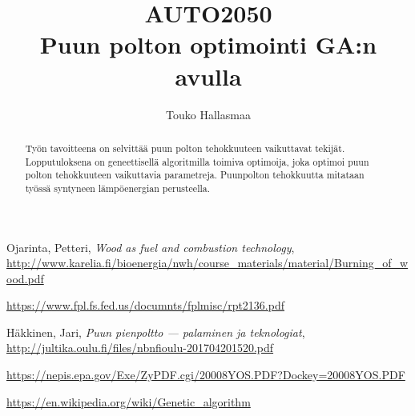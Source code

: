 \documentclass[12pt]{article}
\title{\normalsize\uppercase{auto2050}\\\Huge Puun polton optimointi GA:n avulla}
\author{Touko Hallasmaa}
\date{}
\begin{document}
\maketitle
\tableofcontents

\begin{abstract}
Työn tavoitteena on selvittää puun polton tehokkuuteen vaikuttavat tekijät.
Lopputuloksena on geneettisellä algoritmilla toimiva optimoija, joka optimoi
puun polton tehokkuuteen vaikuttavia parametreja. Puunpolton tehokkuutta
mitataan työssä syntyneen lämpöenergian perusteella.
\end{abstract}







\begin{thebibliography}{9}
	Ojarinta, Petteri,
	\textit{Wood as fuel and combustion technology},
	\url{http://www.karelia.fi/bioenergia/nwh/course_materials/material/Burning_of_wood.pdf}

	\url{https://www.fpl.fs.fed.us/documnts/fplmisc/rpt2136.pdf}

	Häkkinen, Jari,
	\textit{Puun pienpoltto --- palaminen ja teknologiat},
	\url{http://jultika.oulu.fi/files/nbnfioulu-201704201520.pdf}

	\url{https://nepis.epa.gov/Exe/ZyPDF.cgi/20008YOS.PDF?Dockey=20008YOS.PDF}

	\url{https://en.wikipedia.org/wiki/Genetic_algorithm}

\end{thebibliography}
\end{document}
